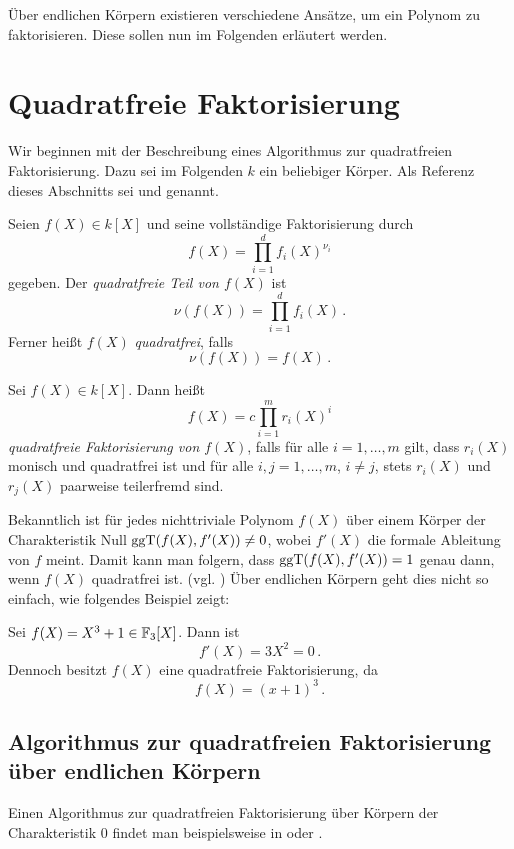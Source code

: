 Über endlichen Körpern existieren 
verschiedene Ansätze, um ein Polynom zu faktorisieren. Diese sollen nun im
Folgenden erläutert werden.

\section{Quadratfreie Faktorisierung}
Wir beginnen mit der Beschreibung eines Algorithmus zur quadratfreien 
Faktorisierung. Dazu sei im Folgenden $k$ ein beliebiger Körper. 
Als Referenz dieses Abschnitts sei 
\autocite[Section 9]{cohen:algebra} und \autocite[Section
8.3]{geddes:algorithms} genannt.


\begin{definition}
  Seien $f(X) \in k[X]$ und seine vollständige Faktorisierung durch
  \[ f(X) = \prod_{i=1}^d f_i(X)^{\nu_i}\]
  gegeben. Der \emph{quadratfreie Teil von $f(X)$} ist
  \[ \nu(f(X)) = \prod_{i=1}^d f_i(X) \,.\]
  Ferner heißt $f(X)$ \emph{quadratfrei}, falls
  \[\nu(f(X)) = f(X)\,.\]
\end{definition}

\begin{definition}
  Sei $f(X) \in k[X]$. Dann heißt
  \[ f(X) = c \prod_{i=1}^m r_i(X)^i\]
  \emph{quadratfreie Faktorisierung von $f(X)$}, falls
  für alle $i=1,\ldots,m$ gilt, dass $r_i(X)$ monisch und quadratfrei ist und
  für alle $i,j=1,\ldots,m$, $i\neq j$, stets $r_i(X)$ und $r_j(X)$ paarweise
  teilerfremd sind.
\end{definition}

Bekanntlich ist für jedes nichttriviale Polynom $f(X)$ über einem Körper der
Charakteristik Null $\operatorname{ggT}(f(X),f'(X)) \neq 0$, wobei $f'(X)$ die formale
Ableitung von $f$ meint. Damit kann man folgern, dass $\operatorname{ggT}(f(X),f'(X)) = 1$
genau dann, wenn $f(X)$ quadratfrei ist. (vgl. \autocites[Theorem
9.4]{cohen:algebra}[Theorem 9.5]{cohen:algebra}) Über endlichen Körpern geht
dies nicht so einfach, wie folgendes Beispiel zeigt:

\begin{beispiel}
  Sei $f(X) = X^3+1 \in \mathbb{F}_3[X]$. Dann ist 
  \[ f'(X) = 3 X^2 = 0 \,. \]
  Dennoch besitzt $f(X)$ eine quadratfreie Faktorisierung, da
  \[ f(X) = (x+1)^3\,.\]
\end{beispiel}


\subsection{Algorithmus zur quadratfreien Faktorisierung über endlichen
Körpern}
Einen Algorithmus zur quadratfreien Faktorisierung über Körpern der
Charakteristik $0$ findet man beispielsweise in \autocite[Figure 9.1]{cohen:algebra}
oder \autocite[Algorithm 8.1]{geddes:algorithms}.

